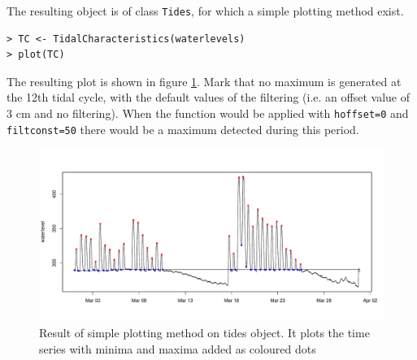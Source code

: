 \documentclass[10pt,a4wide]{article}
\begin{document}
The resulting object is of class \texttt{Tides}, for which a simple plotting method exist. 

\begin{verbatim}
> TC <- TidalCharacteristics(waterlevels)
> plot(TC)
\end{verbatim}
The resulting plot is shown in figure \ref{Fig3}. Mark that no maximum is generated at the 12th tidal cycle, with the default values of the filtering (i.e. an offset value of 3 cm and no filtering). When the function would be applied with \texttt{hoffset=0} and \texttt{filtconst=50} there would be a maximum detected during this period.
\begin{figure}[h]
\begin{center}
\includegraphics[width=\textwidth]{./TideFig3}
\end{center}
\caption{Result of simple plotting method on tides object. It plots the time series with minima and maxima added as coloured dots} 
\label{Fig3}
\end{figure}






\end{document}
